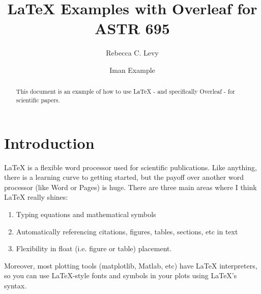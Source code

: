 \documentclass[onecolumn,12pt]{aastex62}
\begin{document}

\title{LaTeX Examples with Overleaf for ASTR 695}

\author{Rebecca C. Levy}
\author{Iman Example}

\begin{abstract}
This document is an example of how to use LaTeX - and specifically Overleaf - for scientific papers.
\end{abstract}


\tableofcontents
\clearpage

\section{Introduction}
\label{sec:intro} %

LaTeX is a flexible word processor used for scientific publications. Like anything, there is a learning curve to getting started, but the payoff over another word processor (like Word or Pages) is huge. There are three main areas where I think LaTeX really shines:
\begin{enumerate}
\itemsep0em 
    \item Typing equations and mathematical symbols
    \item Automatically referencing citations, figures, tables, sections, etc in text
    \item Flexibility in float (i.e. figure or table) placement.
\end{enumerate}
Moreover, most plotting tools (matplotlib, Matlab, etc) have LaTeX interpreters, so you can use LaTeX-style fonts and symbols in your plots using LaTeX's syntax. 
\end{document}
